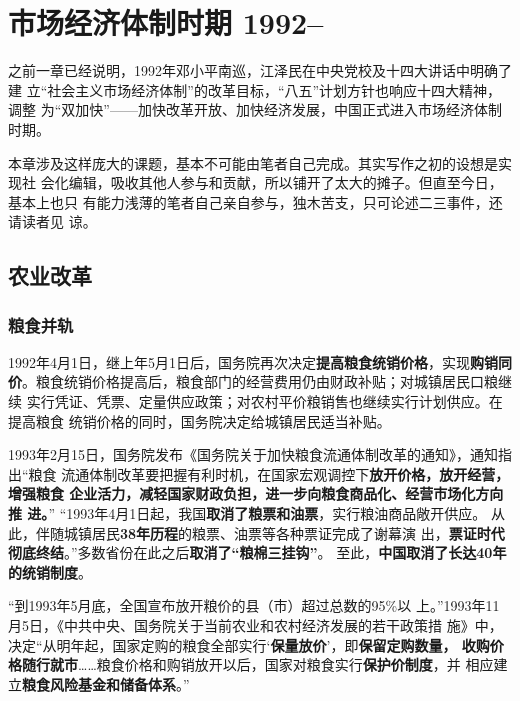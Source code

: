 \chapter{市场经济体制时期 1992--}

之前一章已经说明，1992年邓小平南巡，江泽民在中央党校及十四大讲话中明确了建
立“社会主义市场经济体制”的改革目标，“八五”计划方针也响应十四大精神，调整
为“双加快”——加快改革开放、加快经济发展，中国正式进入市场经济体制时期。

本章涉及这样庞大的课题，基本不可能由笔者自己完成。其实写作之初的设想是实现社
会化编辑，吸收其他人参与和贡献，所以铺开了太大的摊子。但直至今日，基本上也只
有能力浅薄的笔者自己亲自参与，独木苦支，只可论述二三事件，还请读者见
谅。


\section{农业改革}

\subsection{粮食并轨}

1992年4月1日，继上年5月1日后，国务院再次决定\textbf{提高粮食统销价格}，实现\textbf{购销同
  价}。粮食统销价格提高后，粮食部门的经营费用仍由财政补贴；对城镇居民口粮继续
实行凭证、凭票、定量供应政策；对农村平价粮销售也继续实行计划供应。在提高粮食
统销价格的同时，国务院决定给城镇居民适当补贴。

1993年2月15日，国务院发布《国务院关于加快粮食流通体制改革的通知》，通知指出“粮食
流通体制改革要把握有利时机，在国家宏观调控下\textbf{放开价格，放开经营，增强粮食
  企业活力，减轻国家财政负担，进一步向粮食商品化、经营市场化方向推
  进。}” “1993年4月1日起，我国\textbf{取消了粮票和油票}，实行粮油商品敞开供应。
从此，伴随城镇居民\textbf{38年历程}的粮票、油票等各种票证完成了谢幕演
出，\textbf{票证时代彻底终结}。”多数省份在此之后\textbf{取消了“粮棉三挂钩”}。
至此，\textbf{中国取消了长达40年的统销制度}。

“到1993年5月底，全国宣布放开粮价的县（市）超过总数的95\%以
上。”1993年11月5日，《中共中央、国务院关于当前农业和农村经济发展的若干政策措
施》中，决定“从明年起，国家定购的粮食全部实行‘\textbf{保量放价}’，即\textbf{保留定购数量，
收购价格随行就市}……粮食价格和购销放开以后，国家对粮食实行\textbf{保护价制度}，并
相应建立\textbf{粮食风险基金和储备体系}。”

